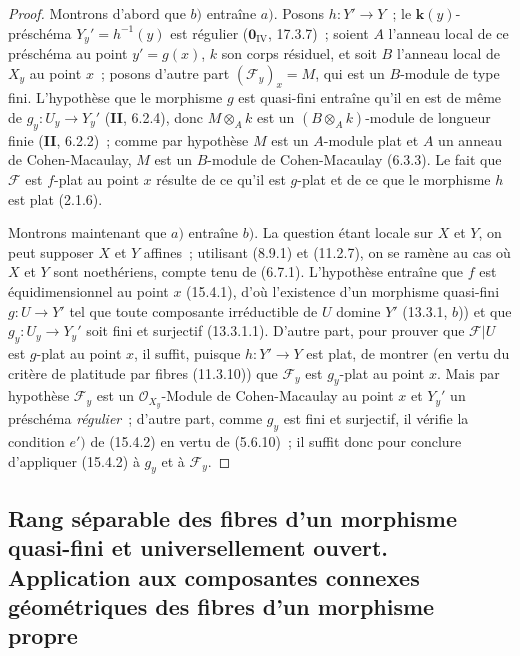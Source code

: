 \begin{proof}
Montrons d'abord que $b)$ entraîne $a)$. Posons $h:Y'\to Y$~; le
$\mathbf{k}(y)$-préschéma $Y_y'=h^{-1}(y)$ est régulier
($\mathbf{0}_{\mathrm{IV}}$, 17.3.7)~; soient $A$ l'anneau local de ce préschéma
au point $y'=g(x)$, $k$ son corps résiduel, et soit $B$ l'anneau local de $X_y$
au point $x$~; posons d'autre part $(\mathcal F_y)_x=M$, qui est un $B$-module
de type fini. L'hypothèse que le morphisme $g$ est quasi-fini entraîne qu'il en
est de même de $g_y:U_y\to Y_y'$ (\textbf{II}, 6.2.4), donc $M\otimes_A k$ est
un $(B\otimes_A k)$-module de longueur finie (\textbf{II}, 6.2.2)~; comme par
hypothèse $M$ est un $A$-module plat et $A$ un anneau de Cohen-Macaulay, $M$ est
un $B$-module de Cohen-Macaulay (6.3.3). Le fait que $\mathcal F$ est $f$-plat
au point $x$ résulte de ce qu'il est $g$-plat et de ce que le morphisme $h$ est
plat (2.1.6).

Montrons maintenant que $a)$ entraîne $b)$. La question étant locale sur $X$ et
$Y$, on peut supposer $X$ et $Y$ affines~; utilisant (8.9.1) et (11.2.7), on se
ramène au cas où $X$ et $Y$ sont noethériens, compte tenu de (6.7.1).
L'hypothèse entraîne que $f$ est
équidimensionnel au point $x$ (15.4.1), d'où l'existence d'un morphisme
quasi-fini $g:U\to Y'$ tel que toute composante irréductible de $U$ domine $Y'$
(13.3.1, $b$)) et que $g_y:U_y\to Y_y'$ soit fini et surjectif (13.3.1.1).
D'autre part, pour prouver que $\mathcal F|U$ est $g$-plat au point $x$, il
suffit, puisque $h:Y'\to Y$ est plat, de montrer (en vertu du critère de
platitude par fibres (11.3.10)) que $\mathcal F_y$ est $g_y$-plat au point $x$.
Mais par hypothèse $\mathcal F_y$ est un $\mathcal O_{X_y}$-Module de
Cohen-Macaulay au point $x$ et $Y_y'$ un préschéma \emph{régulier}~; d'autre
part, comme $g_y$ est fini et surjectif, il vérifie la condition $e')$ de
(15.4.2) en vertu de (5.6.10)~; il suffit donc pour conclure d'appliquer (15.4.2)
à $g_y$ et à $\mathcal F_y$.
\end{proof}


\subsection{Rang séparable des fibres d'un morphisme quasi-fini et universellement ouvert. Application aux composantes connexes géométriques des fibres d'un morphisme propre}
\label{subsection:IV.15.5-fr}

